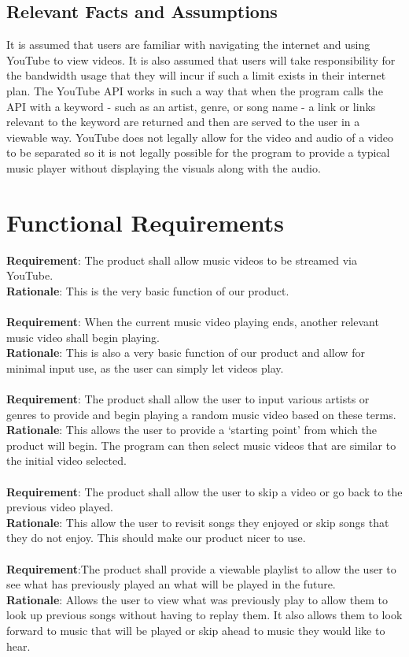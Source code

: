 \documentclass[12pt, titlepage]{article}
\begin{document}
\subsection{Relevant Facts and Assumptions}
\color{red}It is assumed that users are familiar with navigating the internet and using YouTube to view videos. \color{black}It is also assumed that users will take responsibility for the bandwidth usage that they will incur if such a limit exists in their internet plan. The YouTube API works in such a way that when the program calls the API with a keyword - such as an artist, genre, or song name - a link or links relevant to the keyword are returned and then are served to the user in a viewable way. YouTube does not legally allow for the video and audio of a video to be separated so it is not legally possible for the program to provide a typical music player without displaying the visuals along with the audio.

\section{Functional Requirements}

\textbf{Requirement}: The product shall allow music videos to be streamed via YouTube.\\
\textbf{Rationale}: This is the very basic function of our product.\\\\
\textbf{Requirement}: When the current music video playing ends, another relevant music video shall begin playing.\\
\textbf{Rationale}: This is also a very basic function of our product and allow for minimal input use, as the user can simply let videos play.\\\\
\textbf{Requirement}: The product shall allow the user to input various artists or genres to provide and begin playing a random music video based on these terms.\\
\textbf{Rationale}: This allows the user to provide a ‘starting point’ from which the product will begin.  The program can then select music videos that are similar to the initial video selected.\\\\
\textbf{Requirement}: The product shall allow the user to skip a video or go back to the previous video played.\\
\textbf{Rationale}: This allow the user to revisit songs they enjoyed or skip songs that they do not enjoy.  This should make our product nicer to use.\\\\
\textbf{Requirement}:The product shall provide a viewable playlist to allow the user to see what has previously played an what will be played in the future.\\
\textbf{Rationale}: Allows the user to view what was previously play to allow them to look up previous songs without having to replay them. It also allows them to look forward to music that will be played or skip ahead to music they would like to hear.
\end{document}
